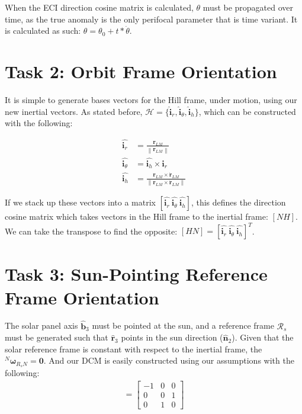 \documentclass[paper]{aiaaNew}
\newcommand{\norm}[1]{\left\lVert#1\right\rVert}
\begin{document}
When the ECI direction cosine matrix is calculated, $\theta$ must be propagated over time, as the true anomaly is the only perifocal parameter that is time variant. It is calculated as such: $\theta = \theta_0 + t*\dot{\theta}$.







\section*{Task 2: Orbit Frame Orientation}
It is simple to generate bases vectors for the Hill frame, under motion, using our new inertial vectors. As stated before, $\mathcal{H} = \{\bm{\hat{i}}_r, \bm{\hat{i}}_\theta, \bm{\hat{i}}_h \}$, which can be constructed with the following:

\begin{align}
  \hat{\bm{i}_r} &= \frac{\bm{r}_{LM}}{\norm{\bm{r}_{LM}}} \\
  \hat{\bm{i}_\theta} &= \hat{\bm{i}_h} \times \hat{\bm{i}_r} \\
  \hat{\bm{i}_h} &= \frac{\bm{r}_{LM} \times \dot{\bm{r}}_{LM}}{\norm{\bm{r}_{LM} \times \dot{\bm{r}}_{LM}}}
\end{align}

If we stack up these vectors into a matrix $[\hat{\bm{i}_r} \ \hat{\bm{i}_\theta} \ \hat{\bm{i}_h}]$, this defines the direction cosine matrix which takes vectors in the Hill frame to the inertial frame: $[NH]$. We can take the transpose to find the opposite: $[HN] = [\hat{\bm{i}_r} \ \hat{\bm{i}_\theta} \ \hat{\bm{i}_h}]^T$.









\section*{Task 3: Sun-Pointing Reference Frame Orientation}
The solar panel axis $\hat{\bm{b}}_3$ must be pointed at the sun, and a reference frame $\mathcal{R}_s$ must be generated such that $\hat{\bm{r}}_3$ points in the sun direction ($\hat{\bm{n}}_2$). Given that the solar reference frame is constant with respect to the inertial frame, the $^N\bm{\omega}_{R_s N} = \bm{0}$. And our DCM is easily constructed using our assumptions with the following: 
\begin{align}
  [R_sN] =  
  \begin{bmatrix}
  -1 & 0 & 0 \\
  0 & 0 & 1 \\
  0 & 1 & 0
  \end{bmatrix}
\end{align}
\end{document}
